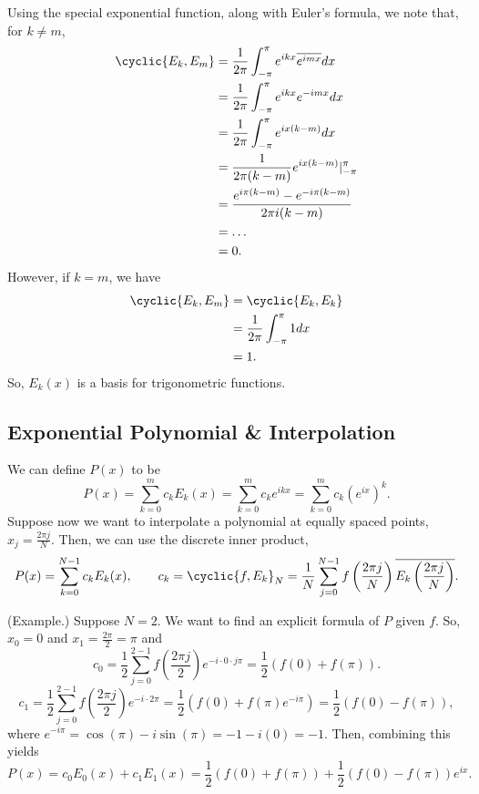 \documentclass[letterpaper]{article}
\begin{document}
Using the special exponential function, along with Euler's formula, we note that, for $k \neq m$, 
\[\begin{aligned}
    \cyclic{E_k, E_m} &= \frac{1}{2\pi} \int_{-\pi}^{\pi} e^{ikx} \overline{e^{imx}} dx \\ 
        &= \frac{1}{2\pi} \int_{-\pi}^{\pi} e^{ikx} e^{-imx} dx \\ 
        &= \frac{1}{2\pi} \int_{-\pi}^{\pi} e^{ix(k - m)} dx \\ 
        &= \frac{1}{2\pi(k - m)} e^{ix(k - m)} \rvert_{-\pi}^{\pi} \\ 
        &= \frac{e^{i\pi (k - m)} - e^{-i\pi(k - m)}}{2\pi i (k - m)} \\ 
        &= \hdots \\ 
        &= 0. 
\end{aligned}\]
However, if $k = m$, we have 
\[\begin{aligned}
    \cyclic{E_{k}, E_{m}} &= \cyclic{E_{k}, E_{k}} \\ 
        &= \frac{1}{2\pi} \int_{-\pi}^{\pi} 1 dx \\ 
        &= 1.
\end{aligned}\]
So, $E_{k}(x)$ is a basis for trigonometric functions. 

\subsection{Exponential Polynomial \& Interpolation}
We can define $P(x)$ to be 
\begin{equation}
    P(x) = \sum_{k = 0}^{m} c_{k} E_{k}(x) = \sum_{k = 0}^{m} c_{k} e^{ikx} = \sum_{k = 0}^{m} c_{k} \left(e^{ix}\right)^k.
\end{equation}
Suppose now we want to interpolate a polynomial at equally spaced points, $x_{j} = \frac{2\pi j}{N}.$ Then, we can use the discrete inner product, 
\[P(x) = \sum_{k = 0}^{N - 1} c_{k} E_{k}(x), \qquad c_{k} = \cyclic{f, E_{k}}_{N} = \frac{1}{N} \sum_{j = 0}^{N - 1} f\left(\frac{2\pi j}{N}\right) \overline{E_{k}\left(\frac{2\pi j}{N}\right)}.\]

\begin{mdframed}
    (Example.) Suppose $N = 2$. We want to find an explicit formula of $P$ given $f$. So, $x_{0} = 0$ and $x_{1} = \frac{2\pi}{2} = \pi$ and
    \[c_{0} = \frac{1}{2} \sum_{j = 0}^{2 - 1} f\left(\frac{2\pi j}{2}\right) e^{-i \cdot 0 \cdot j\pi} = \frac{1}{2} (f(0) + f(\pi)).\]
    \[c_{1} = \frac{1}{2} \sum_{j = 0}^{2 - 1} f\left(\frac{2\pi j}{2}\right) e^{-i \cdot 2\pi} = \frac{1}{2}\left(f(0) + f(\pi)e^{-i\pi}\right) = \frac{1}{2} (f(0) - f(\pi)),\]
    where $e^{-i\pi} = \cos(\pi) - i\sin(\pi) = -1 - i(0) = -1$. Then, combining this yields 
    \[P(x) = c_{0}E_{0}(x) + c_{1}E_{1}(x) = \frac{1}{2}(f(0) + f(\pi)) + \frac{1}{2}(f(0) - f(\pi)) e^{ix}.\]
\end{mdframed}
\end{document}
